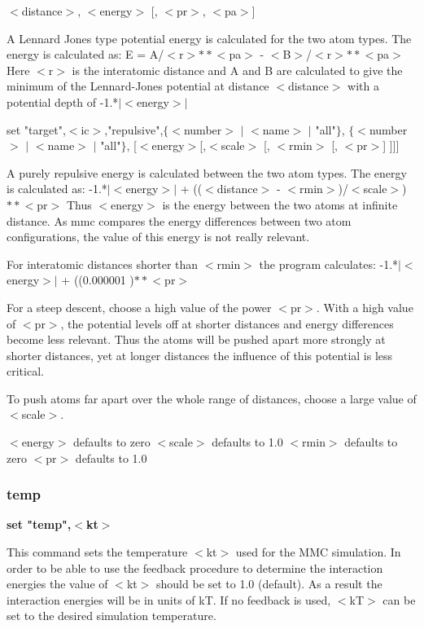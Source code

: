                               $ <$distance$> $,    $ <$energy$> $ [, $ <$pr$> $, $ <$pa$> $] 
\par
A Lennard Jones type potential energy is calculated for the two 
atom types. 
The energy is calculated as: 
E = A/$ <$r$> $$**$$ <$pa$> $ - $ <$B$> $/$ <$r$> $$**$$ <$pa$> $ 
Here $ <$r$> $ is the interatomic distance and 
A and B are calculated to give the minimum of the 
Lennard-Jones potential at distance $ <$distance$> $ with a potential 
depth of -1.*$| $$ <$energy$> $$| $ 
\par
set "target",$ <$ic$> $,"repulsive",$ \{$$ <$number$> $ $| $ $ <$name$> $ $| $ "all"$\} $, 
                              $ \{$$ <$number$> $ $| $ $ <$name$> $ $| $ "all"$\} $, 
                              [$ <$energy$> $[,$ <$scale$> $ [, $ <$rmin$> $ [, $ <$pr$> $] ]]] 
\par
A purely repulsive energy is calculated between the two atom types. 
The energy is calculated as: 
-1.*$| $$ <$energy$> $$| $ + (($ <$distance$> $ - $ <$rmin$> $)/$ <$scale$> $)$**$$ <$pr$> $ 
Thus $ <$energy$> $ is the energy between the two atoms at infinite distance. 
As mmc compares the energy differences between two atom configurations, 
the value of this energy is not really relevant. 
\par
For interatomic distances shorter than $ <$rmin$> $ the program calculates: 
-1.*$| $$ <$energy$> $$| $ + ((0.000001                    )$**$$ <$pr$> $ 
\par
For a steep descent, choose a high value of the power $ <$pr$> $. With a 
high value of $ <$pr$> $, the potential levels off at shorter distances 
and energy differences become less relevant. Thus the atoms will be 
pushed apart more strongly at shorter distances, yet at longer 
distances the influence of this potential is less critical. 
\par
To push atoms far apart over the whole range of distances, choose a 
large value of $ <$scale$> $. 
\par
$ <$energy$> $ defaults to zero 
$ <$scale$> $  defaults to 1.0 
$ <$rmin$> $   defaults to zero 
$ <$pr$> $     defaults to 1.0 
\subsubsection{temp}
{\bf set "temp",$ <$kt$> $ \par }
\par
\vspace{3pt}
This command sets the temperature $ <$kt$> $ used for the MMC simulation. 
In order to be able to use the feedback procedure to determine the 
interaction energies the value of $ <$kt$> $ should be set to 1.0 (default). 
As a result the interaction energies will be in units of kT. If no 
feedback is used, $ <$kT$> $ can be set to the desired simulation temperature. 
